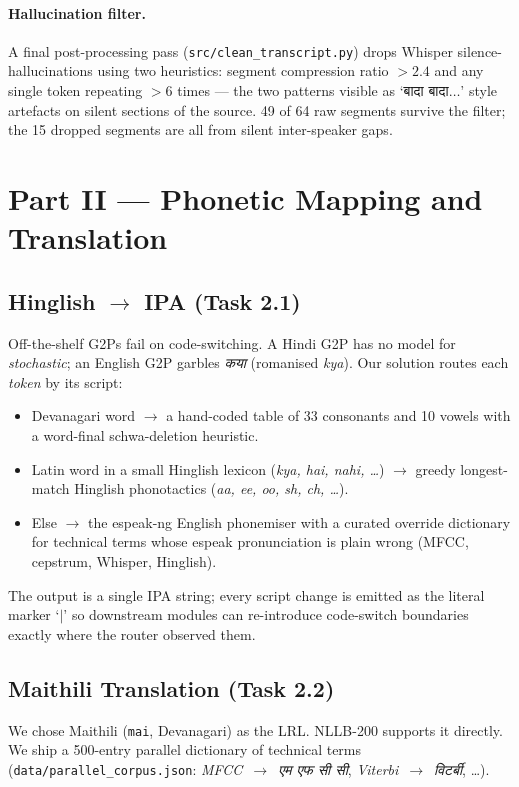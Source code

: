 \documentclass[conference]{IEEEtran}
\newcommand{\hin}[1]{{\hindifont #1}}
\begin{document}
\paragraph*{Hallucination filter.} A final post-processing pass
(\texttt{src/clean\_transcript.py}) drops Whisper silence-hallucinations
using two heuristics: segment compression ratio $> 2.4$ and any single
token repeating $> 6$ times --- the two patterns visible as
`\hin{बादा} \hin{बादा}$\ldots$' style artefacts on silent sections of
the source. 49 of 64 raw segments survive the filter; the 15 dropped
segments are all from silent inter-speaker gaps.

\section{Part II --- Phonetic Mapping and Translation}

\subsection{Hinglish $\rightarrow$ IPA (Task 2.1)}
Off-the-shelf G2Ps fail on code-switching. A Hindi G2P has no model for
\textit{stochastic}; an English G2P garbles \textit{\hin{कया}} (romanised
\textit{kya}). Our solution routes each \emph{token} by its script:
\begin{itemize}
\item Devanagari word $\to$ a hand-coded table of 33 consonants and 10 vowels
with a word-final schwa-deletion heuristic.
\item Latin word in a small Hinglish lexicon
(\textit{kya, hai, nahi, \ldots}) $\to$ greedy longest-match Hinglish
phonotactics (\textit{aa, ee, oo, sh, ch, \ldots}).
\item Else $\to$ the espeak-ng English phonemiser with a curated override
dictionary for technical terms whose espeak pronunciation is plain wrong
(MFCC, cepstrum, Whisper, Hinglish).
\end{itemize}
The output is a single IPA string; every script change is emitted as the
literal marker `$|$' so downstream modules can re-introduce code-switch
boundaries exactly where the router observed them.

\subsection{Maithili Translation (Task 2.2)}
We chose Maithili (\texttt{mai}, Devanagari) as the LRL. NLLB-200 supports it
directly. We ship a 500-entry parallel dictionary of technical terms
(\texttt{data/parallel\_corpus.json}: \textit{MFCC}~$\to$~\textit{\hin{एम एफ सी}
\hin{सी}}, \textit{Viterbi}~$\to$~\textit{\hin{विटर्बी}}, \ldots).
\end{document}
